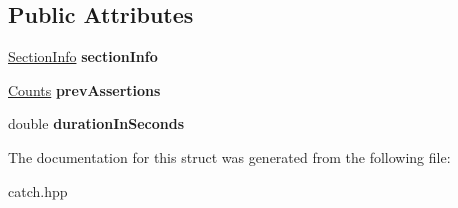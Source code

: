 \subsection*{Public Attributes}
\begin{DoxyCompactItemize}
\item 
\mbox{\label{structCatch_1_1SectionEndInfo_a2d44793392cb83735d086d726822abe9}} 
\hyperlink{structCatch_1_1SectionInfo}{Section\+Info} {\bfseries section\+Info}
\item 
\mbox{\label{structCatch_1_1SectionEndInfo_ae70b154cbc05b5dd2901d97f89303d8c}} 
\hyperlink{structCatch_1_1Counts}{Counts} {\bfseries prev\+Assertions}
\item 
\mbox{\label{structCatch_1_1SectionEndInfo_a7c262f2dab9cff166b8eca620c47eea5}} 
double {\bfseries duration\+In\+Seconds}
\end{DoxyCompactItemize}


The documentation for this struct was generated from the following file\+:\begin{DoxyCompactItemize}
\item 
catch.\+hpp\end{DoxyCompactItemize}
